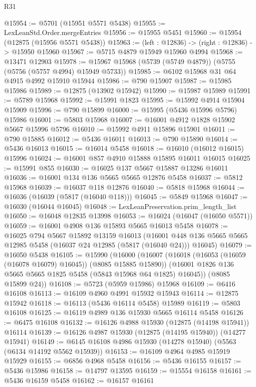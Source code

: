 \begin{lexlean}{R31}
\begin{coremodule}
@15954 := @5701 (@15951 @5571 @5438)
@15955 := LexLeanStd.Order.mergeEntries
@15956 := @15955 @5451
@15960 := @15954 (@12875 (@15956 @5571 @5438))
@15963 := (left : @12836) -> (right : @12836) -> @15950 @15960
@15967 := @5715 @4879 @15949 @15960 @4994
@15968 := @13471 @12903
@15978 := @15967 @15968 (@5739 (@5749 @4879)) (@5755 (@5756 (@5757 @4994) @15949 @5733))
@15985 := @6102 @15968 @31 @64 @4915 @4992 @15910 @15944
@15986 := @790 @15907
@15987 := @15985 @15986
@15989 := @12875 (@13902 @15942)
@15990 := @15987 @15989
@15991 := @5789 @15968
@15992 := @15991 @1823
@15995 := @15992 @4914 @15904 @15909
@15996 := @790 @15899
@16000 := @15995 (@5436 @15996 @5796) @15986
@16001 := @5803 @15968
@16007 := @16001 @4912 @1828 @15902 @5667 @15996 @5796
@16010 := @15992 @4911 @15896 @15901
@16011 := @790 @15885
@16012 := @5436 @16011
@16013 := @790 @15890
@16014 := @5436 @16013
@16015 := @16014 @5458
@16018 := @16010 (@16012 @16015) @15996
@16024 := @16001 @857 @4910 @15888 @15895 @16011 @16015
@16025 := @15991 @855
@16030 := @16025 @137 @5667 @15887 @13286 @16011
@16036 := @16001 @134 @136 @5665 @5665 @12876 @5458
@16037 := @5812 @15968
@16039 := @16037 @118 @12876
@16040 := @5818 @15968
@16044 := @16036 (@16039 (@5817 (@16040 @118)))
@16045 := @5849 @15968
@16047 := @16030 (@16044 @16045)
@16048 := LexLeanPreservation.prim_length_list
@16050 := @16048 @12835 @13998
@16053 := @16024 (@16047 (@16050 @5571))
@16059 := @16001 @4908 @136 @15893 @5665 @16013 @5458
@16078 := @16025
    @794
    @5667
    @15892
    @13159
    @16013
    (@16001 @448 @136 @5665 @5665 @12985 @5458 (@16037 @24 @12985 (@5817 (@16040 @24))) @16045)
@16079 := @16050 @5438
@16105 := @15990
    (@16000
      (@16007
        (@16018 (@16053 (@16059 (@16078 @16079) @16045)) (@8085 @15885 @15890))
        (@16001 @1826 @136 @5665 @5665 @1825 @5458 (@5843 @15968 @64 @1825) @16045))
      (@8085 @15899 @24))
@16108 := @5723 (@5959 @15986) @15968
@16109 := @6416 @16108
@16113 := @16109 @4960 @4991 @15932 @15943
@16114 := @12875 @15942
@16118 := @16113 (@5436 @16114 @5458) @15989
@16119 := @5803 @16108
@16125 := @16119 @4989 @136 @15930 @5665 @16114 @5458
@16126 := @6475 @16108
@16132 := @16126 @4988 @15930 (@12875 (@14198 @15941)) @16114
@16139 := @16126 @4987 @15930 (@12875 (@14195 @15940)) (@14277 @15941)
@16149 := @6145 @16108 @4986 @15930 (@14278 @15940) (@5563 (@6134 @14192 @5562 @15939))
@16153 := @16109 @4964 @4985 @15919 @15929
@16155 := @6856 @4968 @5458
@16156 := @5436 @16155
@16157 := @5436 @15986
@16158 := @14797 @13595
@16159 := @15554 @16158
@16161 := @5436 @16159 @5458
@16162 := @16157 @16161

\end{coremodule}
\end{lexlean}
